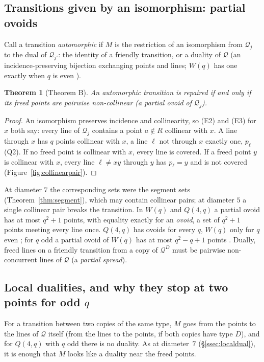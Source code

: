 \documentclass[11pt]{amsart}
\newtheorem{theorem}{Theorem}[section]
\theoremstyle{definition}
\theoremstyle{remark}
\newcommand{\cQ}{\mathcal{Q}}
\begin{document}
\subsection{Transitions given by an isomorphism: partial ovoids}\label{ssec:thmB5}
Call a transition \emph{automorphic} if $M$ is the restriction of an isomorphism from $\cQ_j$ to the dual of $\cQ_{j'}$: the identity of a friendly transition, or a duality of $\cQ$ (an incidence-preserving bijection exchanging points and lines; $W(q)$ has one exactly when $q$ is even \cite[3.2.1]{PT}).

\begin{theorem}[Theorem B]\label{thm:B5}
An automorphic transition is repaired if and only if its freed points are pairwise non-collinear (a \emph{partial ovoid} of $\cQ_j$).
\end{theorem}

\begin{proof}
An isomorphism preserves incidence and collinearity, so (E2) and (E3) for $x$ both say: every line of $\cQ_j$ contains a point $a\notin R$ collinear with $x$. A line through $x$ has $q$ points collinear with $x$, a line $\ell$ not through $x$ exactly one, $p_\ell$ (Q2). If no freed point is collinear with $x$, every line is covered. If a freed point $y$ is collinear with $x$, every line $\ell\ne xy$ through $y$ has $p_\ell=y$ and is not covered (Figure~\ref{fig:collinearpair}).
\end{proof}

At diameter $7$ the corresponding sets were the segment sets (Theorem~\ref{thm:segment}), which may contain collinear pairs; at diameter $5$ a single collinear pair breaks the transition. In $W(q)$ and $Q(4,q)$ a partial ovoid has at most $q^2+1$ points, with equality exactly for an \emph{ovoid}, a set of $q^2+1$ points meeting every line once. $Q(4,q)$ has ovoids for every $q$, $W(q)$ only for $q$ even \cite[3.4.1, 3.4.2]{PT}; for $q$ odd a partial ovoid of $W(q)$ has at most $q^2-q+1$ points \cite{Ta91}. Dually, freed lines on a friendly transition from a copy of $\cQ^D$ must be pairwise non-concurrent lines of $\cQ$ (a \emph{partial spread}).

\subsection{Local dualities, and why they stop at two points for odd \texorpdfstring{$q$}{q}}\label{ssec:thmC5}
For a transition between two copies of the same type, $M$ goes from the points to the lines of $\cQ$ itself (from the lines to the points, if both copies have type $D$), and for $Q(4,q)$ with $q$ odd there is no duality. As at diameter~$7$ (\S\ref{ssec:localdual}), it is enough that $M$ looks like a duality near the freed points.
\end{document}

